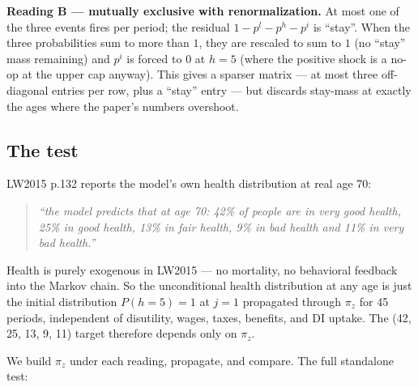 \textbf{Reading B --- mutually exclusive with renormalization.} At most one of the three events fires per period; the residual $1 - p^l - p^h - p^i$ is ``stay''. When the three probabilities sum to more than $1$, they are rescaled to sum to $1$ (no ``stay'' mass remaining) and $p^i$ is forced to $0$ at $h=5$ (where the positive shock is a no-op at the upper cap anyway). This gives a sparser matrix --- at most three off-diagonal entries per row, plus a ``stay'' entry --- but discards stay-mass at exactly the ages where the paper's numbers overshoot.

\subsection*{The test}

LW2015 p.132 reports the model's own health distribution at real age 70:
\begin{quote}
\emph{``the model predicts that at age 70: 42\% of people are in very good health, 25\% in good health, 13\% in fair health, 9\% in bad health and 11\% in very bad health.''}
\end{quote}
Health is purely exogenous in LW2015 --- no mortality, no behavioral feedback into the Markov chain. So the unconditional health distribution at any age is just the initial distribution $P(h=5)=1$ at $j=1$ propagated through $\pi_z$ for 45 periods, independent of disutility, wages, taxes, benefits, and DI uptake. The (42, 25, 13, 9, 11) target therefore depends only on $\pi_z$.

We build $\pi_z$ under each reading, propagate, and compare. The full standalone test:

